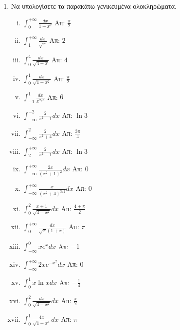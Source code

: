 



\pagestyle{askhseis}
\everymath{\displaystyle}




\begin{center}
  \minibox{\large \bfseries \textcolor{Col1}{Ασκήσεις στα Γενικευμένα Ολοκληρώματα}}
\end{center}

\vspace{\baselineskip}


\begin{enumerate}

\item Να υπολογίσετε τα παρακάτω γενικευμένα ολοκληρώματα.

\begin{enumerate}[i)]
\item $\int_{0}^{+\infty} \frac{dx}{1+x^2}$ \hfill Απ: $\frac{\pi}{2}$
\item $\int_{1}^{+\infty}\frac{dx}{\sqrt{x}}$ \hfill Απ: $2$
\item $\int_{0}^{4}\frac{dx}{\sqrt{4-x}}$ \hfill Απ: $4$
\item $\int_{0}^{1}\frac{dx}{\sqrt{1-x^2}}$ \hfill Απ: $\frac{\pi}{2}$
\item $\int_{-1}^{1}\frac{dx}{x^{2/3}}$ \hfill Απ: $6$
\item $\int_{-\infty}^{-2}\frac{2}{x^2-1}dx$ \hfill Απ: $\ln 3$
\item $\int_{-\infty}^{2}\frac{2}{x^2+4}dx$ \hfill Απ: $\frac{3\pi}{4}$
\item $\int_{2}^{+\infty}\frac{2}{x^2-1}dx$ \hfill Απ: $\ln 3$
\item $\int_{-\infty}^{+\infty}\frac{2x}{(x^2+1)^2}dx$ \hfill Απ: $0$
\item $\int_{-\infty}^{+\infty}\frac{x}{(x^2+4)^{3/2}}dx$ \hfill Απ: $0$
\item $\int_{0}^{2}\frac{x+1}{\sqrt{4-x^2}}dx$ \hfill Απ: $\frac{4+\pi}{2}$
\item $\int_{0}^{+\infty}\frac{dx}{\sqrt{x}(1+x)}$ \hfill Απ: $\pi$
\item $\int_{-\infty}^{0}xe^x dx$ \hfill Απ: $-1$
\item $\int_{-\infty}^{+\infty}2xe^{-x^2}dx$ \hfill Απ: $0$
\item $\int_{0}^{1}x\ln x dx$ \hfill Απ: $-\frac{1}{4}$
\item $\int_{0}^{2}\frac{dx}{\sqrt{4-x^2}}dx$ \hfill Απ: $\frac{\pi}{2}$
\item $\int_{0}^{1}\frac{4x}{\sqrt{1-x^4}}dx$ \hfill Απ: $\pi$
\end{enumerate}
\end{enumerate}






